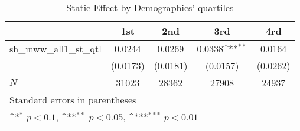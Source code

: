 \begin{table}[htbp]\centering
\def\sym#1{\ifmmode^{#1}\else\(^{#1}\)\fi}
\caption{Static Effect by Demographics' quartiles}
\begin{tabular}{l*{4}{c}}
\hline\hline
            &\multicolumn{1}{c}{1st}&\multicolumn{1}{c}{2nd}&\multicolumn{1}{c}{3rd}&\multicolumn{1}{c}{4rd}\\
\hline
sh\_mww\_all1\_st\_qtl&      0.0244         &      0.0269         &      0.0338\sym{**} &      0.0164         \\
            &    (0.0173)         &    (0.0181)         &    (0.0157)         &    (0.0262)         \\
\hline
\(N\)       &       31023         &       28362         &       27908         &       24937         \\
\hline\hline
\multicolumn{5}{l}{\footnotesize Standard errors in parentheses}\\
\multicolumn{5}{l}{\footnotesize \sym{*} \(p<0.1\), \sym{**} \(p<0.05\), \sym{***} \(p<0.01\)}\\
\end{tabular}
\end{table}

